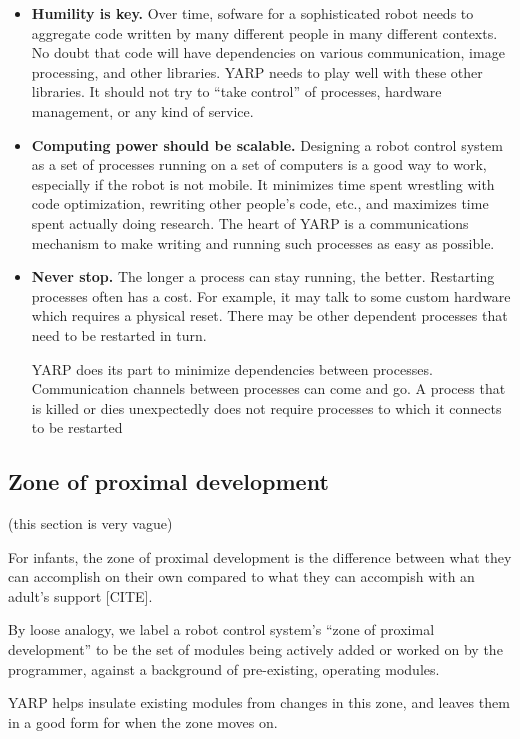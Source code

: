 \begin{itemize}

\item {\bf Humility is key.}
%
Over time, sofware for a sophisticated robot needs to 
aggregate code written by many different people in many
different contexts.  No doubt that code will have
dependencies on various communication, image processing,
and other libraries.
%
YARP needs to play well with these other libraries.
It should not try to ``take control'' of processes,
hardware management, or any kind of service.


\item {\bf Computing power should be scalable.}
%
Designing a robot control system as a set of processes running on
  a set of computers is a good way to work, especially if the robot
  is not mobile.  It minimizes time spent wrestling with code
  optimization, rewriting other people's code, etc., and maximizes
  time spent actually doing research.
  The heart of YARP is a communications mechanism to make writing
  and running such processes as easy as possible.


\item {\bf Never stop.}
%
The longer a process can stay running, the better.  Restarting
  processes often has a cost.  For example, it may talk to some
  custom hardware which requires a physical reset.  There may
  be other dependent processes that need to be restarted in turn.

  YARP does its part to minimize dependencies between processes.
  Communication channels between processes can come and go.
  A process that is killed or dies unexpectedly does not
  require processes to which it connects to be restarted



\end{itemize}


\subsection*{Zone of proximal development}

(this section is very vague)

For infants, the zone of proximal development is the
difference between what they can accomplish on their
own compared to what they can accompish with an
adult's support [CITE].

By loose analogy, we label a robot control system's ``zone of proximal
development'' to be the set of modules being actively added or worked
on by the programmer, against a background of pre-existing, operating
modules.  

YARP helps insulate existing modules from changes in this zone,
and leaves them in a good form for when the zone moves on.
